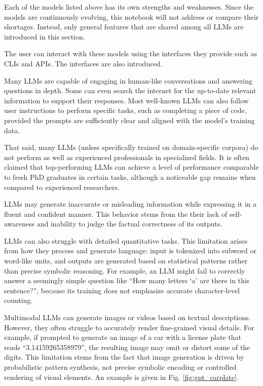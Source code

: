 Each of the models listed above has its own strengths and weaknesses. Since the models are continuously evolving, this notebook will not address or compare their shortages. Instead, only general features that are shared among all LLMs are introduced in this section.

The user can interact with these models using the interfaces they provide such as CLIs and APIs. The interfaces are also introduced.

Many LLMs are capable of engaging in human-like conversations and answering questions in depth. Some can even search the internet for the up-to-date relevant information to support their responses. Most well-known LLMs can also follow user instructions to perform specific tasks, such as completing a piece of code, provided the prompts are sufficiently clear and aligned with the model's training data.

That said, many LLMs (unless specifically trained on domain-specific corpora) do not perform as well as experienced professionals in specialized fields. It is often claimed that top-performing LLMs can achieve a level of performance comparable to fresh PhD graduates in certain tasks, although a noticeable gap remains when compared to experienced researchers.

LLMs may generate inaccurate or misleading information while expressing it in a fluent and confident manner. This behavior stems from the their lack of self-awareness and inability to judge the factual correctness of its outputs.

LLMs can also struggle with detailed quantitative tasks. This limitation arises from how they process and generate language: input is tokenized into subword or word-like units, and outputs are generated based on statistical patterns rather than precise symbolic reasoning. For example, an LLM might fail to correctly answer a seemingly simple question like ``How many letters `a' are there in this sentence?'', because its training does not emphasize accurate character-level counting.

Multimodal LLMs can generate images or videos based on textual descriptions. However, they often struggle to accurately render fine-grained visual details. For example, if prompted to generate an image of a car with a license plate that reads ``3.14159265358979'', the resulting image may omit or distort some of the digits. This limitation stems from the fact that image generation is driven by probabilistic pattern synthesis, not precise symbolic encoding or controlled rendering of visual elements. An example is given in Fig. \ref{fig:gpt_carplate}.


